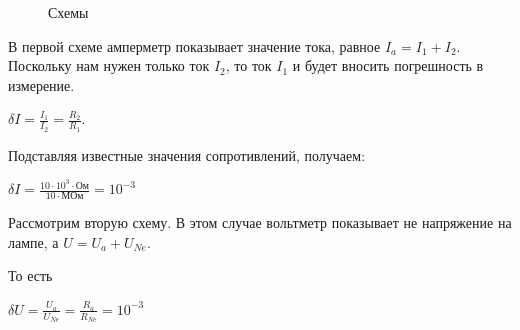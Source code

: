 \begin{figure}[H]
\begin{minipage}[H]{0.49\linewidth}
\end{minipage}
\caption{Схемы}
\end{figure}


В первой схеме амперметр показывает значение тока, равное $I_a=I_1+I_2$. Поскольку нам нужен только ток $I_2$, то ток $I_1$ и будет вносить погрешность в измерение. 
\begin{center}
$\delta I= \frac{I_1}{I_2}=\frac{R_2}{R_1}$. 
\end{center}
Подставляя известные значения сопротивлений, получаем:
\begin{center}
$\delta I=\frac{10\cdot10^3\cdot\text{Ом}}{10\cdot \text{МОм}}=10^{-3}$
\end{center}
Рассмотрим вторую схему. В этом случае вольтметр  показывает не напряжение на лампе, а $U=U_a+U_{Ne}$.

То есть 

\begin{center}
$ \delta U =\frac{U_a}{U_{Ne}}=\frac{R_a}{R_{Ne}} = 10^{-3} $
\end{center}



